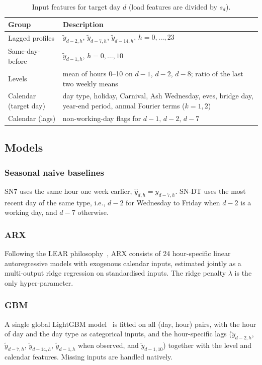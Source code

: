 \begin{table}[!t]
\caption{Input features for target day $d$ (load features are divided by $s_d$).}
\label{tab:features}
\centering
\setlength{\tabcolsep}{3pt}
\begin{tabular}{p{}p{}}
\toprule
Group & Description \\
\midrule
Lagged profiles & $\tilde y_{d-2,h}$, $\tilde y_{d-7,h}$, $\tilde y_{d-14,h}$, $h=0,\dots,23$ \\
Same-day-before & $\tilde y_{d-1,h}$, $h=0,\dots,10$ \\
Levels & mean of hours 0--10 on $d-1$, $d-2$, $d-8$; ratio of the last two weekly means \\
Calendar (target day) & day type, holiday, Carnival, Ash Wednesday, eves, bridge day, year-end period, annual Fourier terms ($k=1,2$) \\
Calendar (lags) & non-working-day flags for $d-1$, $d-2$, $d-7$ \\
\bottomrule
\end{tabular}
\end{table}

\subsection{Models}
\subsubsection{Seasonal naive baselines}
SN7 uses the same hour one week earlier, $\hat y_{d,h}=y_{d-7,h}$. SN-DT uses the most recent day of the same type, i.e., $d-2$ for Wednesday to Friday when $d-2$ is a working day, and $d-7$ otherwise.

\subsubsection{ARX}
Following the LEAR philosophy~\cite{lago2021benchmark,ziel2018multivariate}, ARX consists of 24 hour-specific linear autoregressive models with exogenous calendar inputs, estimated jointly as a multi-output ridge regression on standardised inputs. The ridge penalty $\lambda$ is the only hyper-parameter.

\subsubsection{GBM}
A single global LightGBM model~\cite{ke2017lightgbm} is fitted on all (day, hour) pairs, with the hour of day and the day type as categorical inputs, and the hour-specific lags ($\tilde y_{d-2,h}$, $\tilde y_{d-7,h}$, $\tilde y_{d-14,h}$, $\tilde y_{d-1,h}$ when observed, and $\tilde y_{d-1,10}$) together with the level and calendar features. Missing inputs are handled natively.

